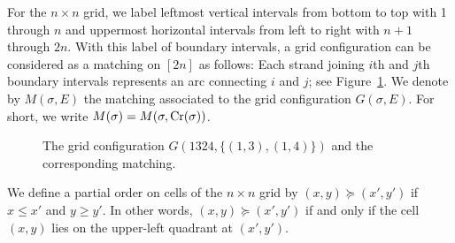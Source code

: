 For the \( n \times n \) grid, we label leftmost vertical intervals
from bottom to top with 1 through $n$ and uppermost horizontal intervals
from left to right with $n+1$ through $2n$.
With this label of boundary intervals, a grid configuration can be considered
as a matching on \( [2n] \) as follows:
Each strand joining $i$th and $j$th boundary intervals represents
an arc connecting $i$ and $j$;
see Figure~\ref{Fig: The grid configuration G(1324, (1,3),(1,4))}.
We denote by $M(\sigma,E)$ the matching associated to the grid configuration
\( G(\sigma,E) \). For short, we write \( M(\sigma) = M(\sigma, \operatorname{Cr}(\sigma)) \).

\begin{figure}
  \centering
  \caption{The grid configuration $G(1324,\{(1,3),(1,4)\})$ and the corresponding matching.}
  \label{Fig: The grid configuration G(1324, (1,3),(1,4))}
\end{figure}

We define a partial order on cells of the $n \times n$ grid
by $(x,y)\succeq (x',y')$ if $x\le x'$ and $y\ge y'$.
In other words, \( (x,y)\succeq (x',y') \) if and only if the cell \( (x,y) \) lies
on the upper-left quadrant at \( (x', y') \).

